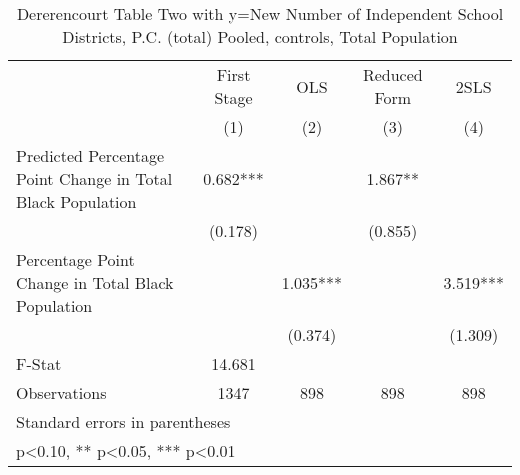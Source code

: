 \begin{table}[htbp]\centering
\def\sym#1{\ifmmode^{#1}\else\(^{#1}\)\fi}
\caption{Dererencourt Table Two with y=New Number of Independent School Districts, P.C. (total)  Pooled,  controls, Total Population}
\begin{tabular}{l*{4}{c}}
\toprule
                    & First Stage   &         OLS   &Reduced Form   &        2SLS   \\
                    &\multicolumn{1}{c}{(1)}   &\multicolumn{1}{c}{(2)}   &\multicolumn{1}{c}{(3)}   &\multicolumn{1}{c}{(4)}   \\
\midrule
Predicted Percentage Point Change in Total Black Population&       0.682***&               &       1.867** &               \\
                    &     (0.178)   &               &     (0.855)   &               \\
\addlinespace
Percentage Point Change in Total Black Population&               &       1.035***&               &       3.519***\\
                    &               &     (0.374)   &               &     (1.309)   \\
\midrule
F-Stat              &      14.681   &               &               &               \\
Observations        &        1347   &         898   &         898   &         898   \\
\bottomrule
\multicolumn{5}{l}{\footnotesize Standard errors in parentheses}\\
\multicolumn{5}{l}{\footnotesize * p<0.10, ** p<0.05, *** p<0.01}\\
\end{tabular}
\end{table}

